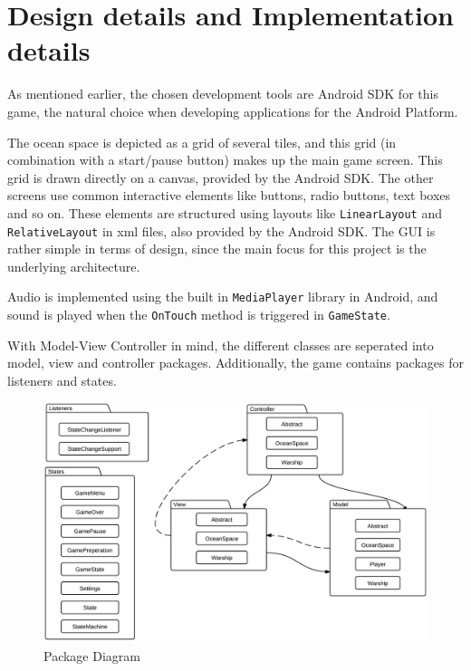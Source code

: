 \chapter{Design details and Implementation details}




As mentioned earlier, the chosen development tools are Android SDK for this game, the natural choice when developing applications for the Android Platform. 

The ocean space is depicted as a grid of several tiles, and this grid (in combination with a start/pause button) makes up the main game screen. This grid is drawn directly on a canvas, provided by the Android SDK. The other screens use common interactive elements like buttons, radio buttons, text boxes and so on. These elements are structured using layouts like \texttt{LinearLayout} and \texttt{RelativeLayout} in xml files, also provided by the Android SDK. The GUI is rather simple in terms of design, since the main focus for this project is the underlying architecture.

Audio is implemented using the built in \texttt{MediaPlayer} library in Android, and sound is played when the \texttt{OnTouch} method is triggered in \texttt{GameState}.

With Model-View Controller in mind, the different classes are seperated into model, view and controller packages. Additionally, the game contains packages for listeners and states. 

\begin{figure}[ht]
    \includegraphics[width=\textwidth]{img/PackageDiagram.png}
    \caption{Package Diagram}
    \label{fig:PackageDiagram}
\end{figure}

